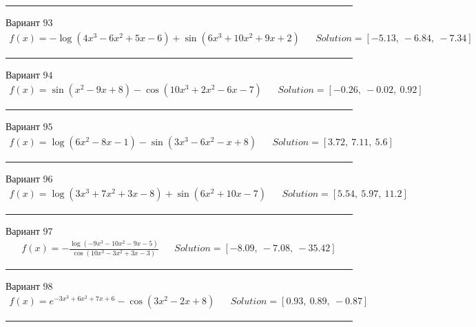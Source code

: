 \documentclass[11pt]{report}
\begin{document}
\begin{center}
    \noindent\rule{8cm}{0.4pt}
\end{center}
Вариант \(93\)
\begin{align*}
    f(x) = - \log{\left(4 x^{3} - 6 x^{2} + 5 x - 6 \right)} + \sin{\left(6 x^{3} + 10 x^{2} + 9 x + 2 \right)} && Solution = \left[ -5.13, \  -6.84, \  -7.34\right]
\end{align*}
\begin{center}
    \noindent\rule{8cm}{0.4pt}
\end{center}
Вариант \(94\)
\begin{align*}
    f(x) = \sin{\left(x^{2} - 9 x + 8 \right)} - \cos{\left(10 x^{3} + 2 x^{2} - 6 x - 7 \right)} && Solution = \left[ -0.26, \  -0.02, \  0.92\right]
\end{align*}
\begin{center}
    \noindent\rule{8cm}{0.4pt}
\end{center}
Вариант \(95\)
\begin{align*}
    f(x) = \log{\left(6 x^{2} - 8 x - 1 \right)} - \sin{\left(3 x^{3} - 6 x^{2} - x + 8 \right)} && Solution = \left[ 3.72, \  7.11, \  5.6\right]
\end{align*}
\begin{center}
    \noindent\rule{8cm}{0.4pt}
\end{center}
Вариант \(96\)
\begin{align*}
    f(x) = \log{\left(3 x^{3} + 7 x^{2} + 3 x - 8 \right)} + \sin{\left(6 x^{2} + 10 x - 7 \right)} && Solution = \left[ 5.54, \  5.97, \  11.2\right]
\end{align*}
\begin{center}
    \noindent\rule{8cm}{0.4pt}
\end{center}
Вариант \(97\)
\begin{align*}
    f(x) = - \frac{\log{\left(- 9 x^{3} - 10 x^{2} - 9 x - 5 \right)}}{\cos{\left(10 x^{3} - 3 x^{2} + 3 x - 3 \right)}} && Solution = \left[ -8.09, \  -7.08, \  -35.42\right]
\end{align*}
\begin{center}
    \noindent\rule{8cm}{0.4pt}
\end{center}
Вариант \(98\)
\begin{align*}
    f(x) = e^{- 3 x^{3} + 6 x^{2} + 7 x + 6} - \cos{\left(3 x^{2} - 2 x + 8 \right)} && Solution = \left[ 0.93, \  0.89, \  -0.87\right]
\end{align*}
\begin{center}
    \noindent\rule{8cm}{0.4pt}
\end{center}
\end{document}
